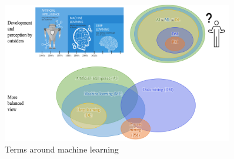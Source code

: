 \begin{figure}[H]
  \centering
  \includegraphics[width=0.9\textwidth]{assets/basics/confusion_terminology.png}
  \caption{Terms around machine learning}
  \label{fig:1_ml_terminology}
\end{figure}




